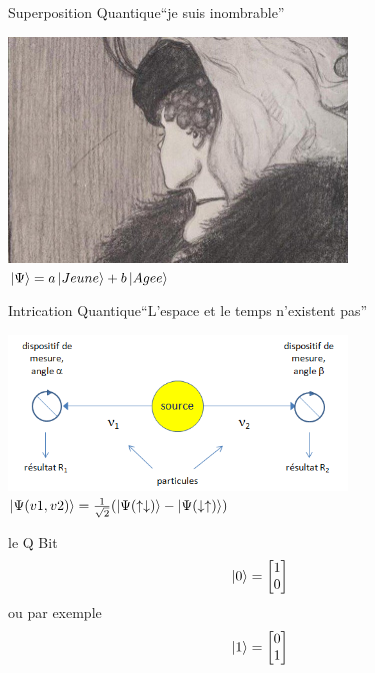 \documentclass{beamer}
\begin{document}
\begin{frame}{Superposition Quantique}{``je suis inombrable''}
  \begin{center}
    \includegraphics[width=9cm]{3604843-inline.jpg}\\
    \vspace{0.5cm}
    $\ket{\Psi} = a \ket{Jeune} + b \ket{Agee}$ 
  \end{center}
\end{frame}

\begin{frame}{Intrication Quantique}{``L'espace et le temps n'existent pas''}
  \begin{center}
        \includegraphics[width=9cm]{intrication.png}\\
    \vspace{0.5cm}
    $\ket{\Psi(v1, v2)} = \frac{1}{\sqrt{2}}(\ket{\Psi(\uparrow\downarrow)} - \ket{\Psi(\downarrow\uparrow)})$
  \end{center}
\end{frame}

\begin{frame}{le Q Bit}
  \begin{equation*}
    \ket{0} =
    \begin{bmatrix}
      1 \\
      0 
    \end{bmatrix}
  \end{equation*}
  ou par exemple 
  \begin{equation*}
    \ket{1} =
    \begin{bmatrix}
      0 \\
      1 
    \end{bmatrix}
  \end{equation*}
\end{frame}
\end{document}

